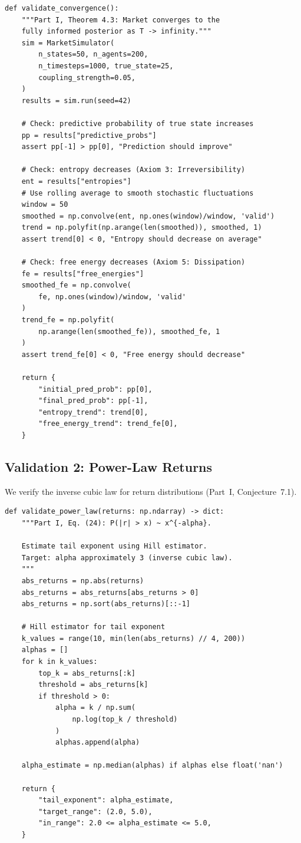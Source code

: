 \documentclass[12pt,a4paper]{article}
\theoremstyle{definition}
\begin{document}
\begin{lstlisting}[caption={Validation: Convergence to Bayesian posterior},label=lst:val1]
def validate_convergence():
    """Part I, Theorem 4.3: Market converges to the
    fully informed posterior as T -> infinity."""
    sim = MarketSimulator(
        n_states=50, n_agents=200,
        n_timesteps=1000, true_state=25,
        coupling_strength=0.05,
    )
    results = sim.run(seed=42)
    
    # Check: predictive probability of true state increases
    pp = results["predictive_probs"]
    assert pp[-1] > pp[0], "Prediction should improve"
    
    # Check: entropy decreases (Axiom 3: Irreversibility)
    ent = results["entropies"]
    # Use rolling average to smooth stochastic fluctuations
    window = 50
    smoothed = np.convolve(ent, np.ones(window)/window, 'valid')
    trend = np.polyfit(np.arange(len(smoothed)), smoothed, 1)
    assert trend[0] < 0, "Entropy should decrease on average"
    
    # Check: free energy decreases (Axiom 5: Dissipation)
    fe = results["free_energies"]
    smoothed_fe = np.convolve(
        fe, np.ones(window)/window, 'valid'
    )
    trend_fe = np.polyfit(
        np.arange(len(smoothed_fe)), smoothed_fe, 1
    )
    assert trend_fe[0] < 0, "Free energy should decrease"
    
    return {
        "initial_pred_prob": pp[0],
        "final_pred_prob": pp[-1],
        "entropy_trend": trend[0],
        "free_energy_trend": trend_fe[0],
    }
\end{lstlisting}

\subsection{Validation 2: Power-Law Returns}

We verify the inverse cubic law for return distributions (Part~I, Conjecture~7.1).

\begin{lstlisting}[caption={Validation: Power-law tail exponents},label=lst:val2]
def validate_power_law(returns: np.ndarray) -> dict:
    """Part I, Eq. (24): P(|r| > x) ~ x^{-alpha}.
    
    Estimate tail exponent using Hill estimator.
    Target: alpha approximately 3 (inverse cubic law).
    """
    abs_returns = np.abs(returns)
    abs_returns = abs_returns[abs_returns > 0]
    abs_returns = np.sort(abs_returns)[::-1]
    
    # Hill estimator for tail exponent
    k_values = range(10, min(len(abs_returns) // 4, 200))
    alphas = []
    for k in k_values:
        top_k = abs_returns[:k]
        threshold = abs_returns[k]
        if threshold > 0:
            alpha = k / np.sum(
                np.log(top_k / threshold)
            )
            alphas.append(alpha)
    
    alpha_estimate = np.median(alphas) if alphas else float('nan')
    
    return {
        "tail_exponent": alpha_estimate,
        "target_range": (2.0, 5.0),
        "in_range": 2.0 <= alpha_estimate <= 5.0,
    }
\end{lstlisting}
\end{document}
